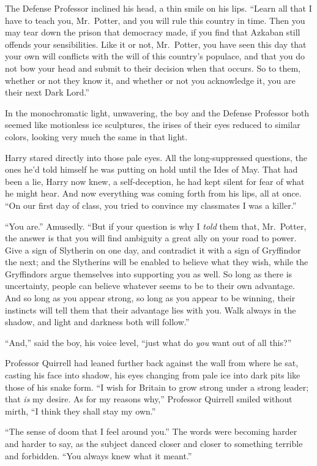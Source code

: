 The Defense Professor inclined his head, a thin smile on his lips. “Learn all that I have to teach you, Mr.~Potter, and you will rule this country in time. Then you may tear down the prison that democracy made, if you find that Azkaban still offends your sensibilities. Like it or not, Mr.~Potter, you have seen this day that your own will conflicts with the will of this country’s populace, and that you do not bow your head and submit to their decision when that occurs. So to them, whether or not they know it, and whether or not you acknowledge it, you are their next Dark Lord.”

In the monochromatic light, unwavering, the boy and the Defense Professor both seemed like motionless ice sculptures, the irises of their eyes reduced to similar colors, looking very much the same in that light.

Harry stared directly into those pale eyes. All the long-suppressed questions, the ones he’d told himself he was putting on hold until the Ides of May. That had been a lie, Harry now knew, a self-deception, he had kept silent for fear of what he might hear. And now everything was coming forth from his lips, all at once. “On our first day of class, you tried to convince my classmates I was a killer.”

“You are.” Amusedly. “But if your question is why I \emph{told} them that, Mr.~Potter, the answer is that you will find ambiguity a great ally on your road to power. Give a sign of Slytherin on one day, and contradict it with a sign of Gryffindor the next; and the Slytherins will be enabled to believe what they wish, while the Gryffindors argue themselves into supporting you as well. So long as there is uncertainty, people can believe whatever seems to be to their own advantage. And so long as you appear strong, so long as you appear to be winning, their instincts will tell them that their advantage lies with you. Walk always in the shadow, and light and darkness both will follow.”

“And,” said the boy, his voice level, “just what do \emph{you} want out of all this?”

Professor Quirrell had leaned further back against the wall from where he sat, casting his face into shadow, his eyes changing from pale ice into dark pits like those of his snake form. “I wish for Britain to grow strong under a strong leader; that \emph{is} my desire. As for my reasons why,” Professor Quirrell smiled without mirth, “I think they shall stay my own.”

“The sense of doom that I feel around you.” The words were becoming harder and harder to say, as the subject danced closer and closer to something terrible and forbidden. “You always knew what it meant.”


